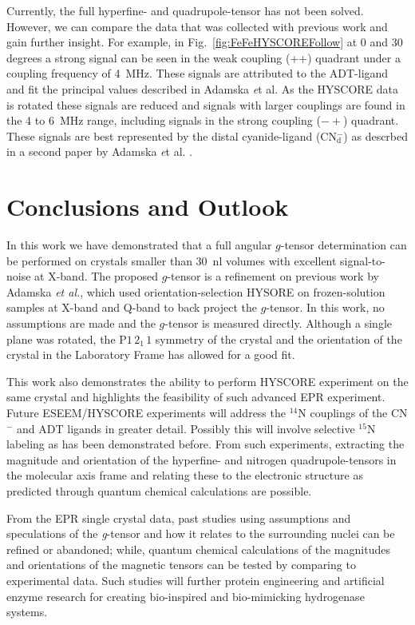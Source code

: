 Currently, the full hyperfine- and quadrupole-tensor has not been solved. However, we can compare the data that was collected with previous work and gain further insight. For example, in Fig.~\ref{fig:FeFeHYSCOREFollow} at 0 and 30 degrees a strong signal can be seen in the weak coupling (++) quadrant under a coupling frequency of 4~MHz. These signals are attributed to the ADT-ligand and fit the principal values described in Adamska {\textit et al.} \cite{Adamska2015pdt} As the HYSCORE data is rotated these signals are reduced and signals with larger couplings are found in the 4 to 6~MHz range, including signals in the strong coupling ($-+$) quadrant. These signals are best represented by the distal cyanide-ligand (CN$_\text{d}^-$) as descrbed in a second paper by Adamska {\textit et al.} \cite{Adamska2015}.

\section{Conclusions and Outlook}
In this work we have demonstrated that a full angular $g$-tensor determination can be performed on crystals smaller than 30~nl volumes with excellent signal-to-noise at X-band. The proposed $g$-tensor is a refinement on previous work by Adamska {\em et al.}, which used orientation-selection HYSORE on frozen-solution samples at X-band and Q-band to back project the $g$-tensor. In this work, no assumptions are made and the $g$-tensor is measured directly. Although a single plane was rotated, the P$1\,2_1\,1$ symmetry of the crystal and the orientation of the crystal in the Laboratory Frame has allowed for a good fit. 

This work also demonstrates the ability to perform HYSCORE experiment on the same crystal and highlights the feasibility of such advanced EPR experiment. Future ESEEM/HYSCORE experiments will address the $^{14}$N couplings of the CN$^-$ and ADT ligands in greater detail. Possibly this will involve selective $^{15}$N labeling as has been demonstrated before. \cite{Adamska2015, AdamskaBridgingAmine} From such experiments, extracting the magnitude and orientation of the hyperfine- and nitrogen quadrupole-tensors in the molecular axis frame and relating these to the electronic structure as predicted through quantum chemical calculations are possible. 

From the EPR single crystal data, past studies using assumptions and speculations of the \textit{g}-tensor and how it relates to the surrounding nuclei can be refined or abandoned; while, quantum chemical calculations of the magnitudes and orientations of the magnetic tensors can be tested by comparing to experimental data. Such studies will further protein engineering and artificial enzyme research for creating bio-inspired and bio-mimicking hydrogenase systems. \cite{C7SE00582B}

{\renewcommand{\bibsection}{\clearpage\section*{\bibname}\markboth{\bibname}{\bibname}}
\renewcommand{\bibname}{CHAPTER 6. REFERENCES}


}